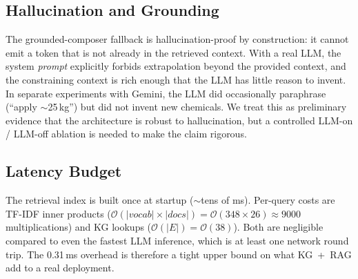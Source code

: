 \documentclass[11pt,a4paper]{article}
\begin{document}
\subsection{Hallucination and Grounding}
The grounded-composer fallback is hallucination-proof by
construction: it cannot emit a token that is not already in the
retrieved context. With a real LLM, the system \emph{prompt}
explicitly forbids extrapolation beyond the provided context, and
the constraining context is rich enough that the LLM has little
reason to invent. In separate experiments with Gemini, the LLM did
occasionally paraphrase (``apply $\sim$25\,kg'') but did not invent
new chemicals. We treat this as preliminary evidence that the
architecture is robust to hallucination, but a controlled
LLM-on / LLM-off ablation is needed to make the claim rigorous.

\subsection{Latency Budget}
The retrieval index is built once at startup ($\sim$tens of ms).
Per-query costs are TF-IDF inner products
($\mathcal{O}(|\mathit{vocab}| \times |\mathit{docs}|)
 = \mathcal{O}(348 \times 26) \approx 9000$ multiplications) and KG
lookups ($\mathcal{O}(|E|) = \mathcal{O}(38)$). Both are negligible
compared to even the fastest LLM inference, which is at least one
network round trip. The 0.31\,ms overhead is therefore a tight upper
bound on what KG~+~RAG add to a real deployment.

\end{document}
